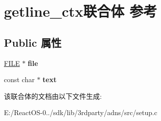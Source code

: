 \hypertarget{uniongetline__ctx}{}\section{getline\+\_\+ctx联合体 参考}
\label{uniongetline__ctx}
\subsection*{Public 属性}
\begin{DoxyCompactItemize}
\item 
\mbox{\label{uniongetline__ctx_aeb4696cb6683e1fa0907b876cf164713}} 
\hyperlink{struct__iobuf}{F\+I\+LE} $\ast$ {\bfseries file}
\item 
\mbox{\label{uniongetline__ctx_af14deaae58612dec2d5507bc1ef72257}} 
const char $\ast$ {\bfseries text}
\end{DoxyCompactItemize}


该联合体的文档由以下文件生成\+:\begin{DoxyCompactItemize}
\item 
E\+:/\+React\+O\+S-\/0../sdk/lib/3rdparty/adns/src/setup.\+c\end{DoxyCompactItemize}
